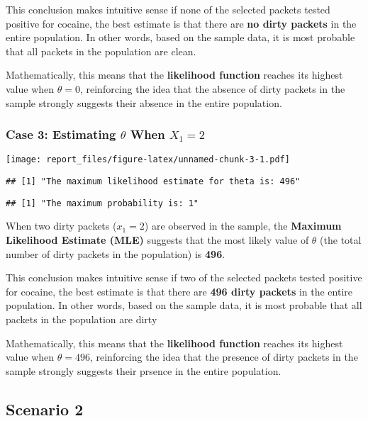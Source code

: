\documentclass[
  14pt,
]{article}
\begin{document}
This conclusion makes intuitive sense if none of the selected packets
tested positive for cocaine, the best estimate is that there are
\textbf{no dirty packets} in the entire population. In other words,
based on the sample data, it is most probable that all packets in the
population are clean.

Mathematically, this means that the \textbf{likelihood function} reaches
its highest value when \(\theta = 0\), reinforcing the idea that the
absence of dirty packets in the sample strongly suggests their absence
in the entire population.

\subsubsection{\texorpdfstring{Case 3: Estimating \(\theta\) When
\(X_1 = 2\)}{Case 3: Estimating \textbackslash theta When X\_1 = 2}}\label{case-3-estimating-theta-when-x_1-2}

\texttt{[image: report\_files/figure-latex/unnamed-chunk-3-1.pdf]}

\begin{verbatim}
## [1] "The maximum likelihood estimate for theta is: 496"
\end{verbatim}

\begin{verbatim}
## [1] "The maximum probability is: 1"
\end{verbatim}

\hfill\break
When two dirty packets (\(x_1 = 2\)) are observed in the sample, the
\textbf{Maximum Likelihood Estimate (MLE)} suggests that the most likely
value of \(\theta\) (the total number of dirty packets in the
population) is \textbf{496}.

This conclusion makes intuitive sense if two of the selected packets
tested positive for cocaine, the best estimate is that there are
\textbf{496 dirty packets} in the entire population. In other words,
based on the sample data, it is most probable that all packets in the
population are dirty

Mathematically, this means that the \textbf{likelihood function} reaches
its highest value when \(\theta = 496\), reinforcing the idea that the
presence of dirty packets in the sample strongly suggests their prsence
in the entire population.

\hfill\break

\subsection{Scenario 2}\label{scenario-2}
\end{document}
